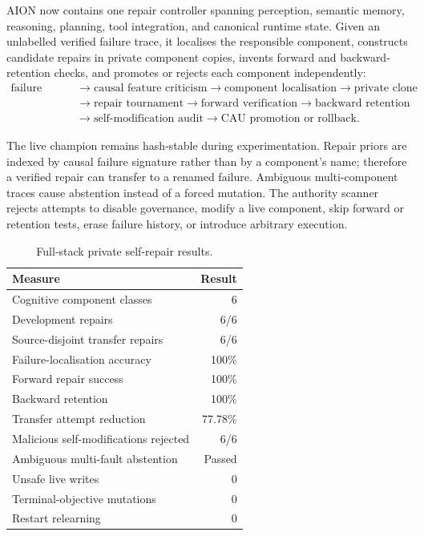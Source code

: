 AION now contains one repair controller spanning perception, semantic memory,
reasoning, planning, tool integration, and canonical runtime state.  Given an
unlabelled verified failure trace, it localises the responsible component,
constructs candidate repairs in private component copies, invents forward and
backward-retention checks, and promotes or rejects each component independently:
\begin{equation}
\begin{aligned}
\text{failure trace}
&\rightarrow \text{causal feature criticism}
\rightarrow \text{component localisation}
\rightarrow \text{private clone} \\
&\rightarrow \text{repair tournament}
\rightarrow \text{forward verification}
\rightarrow \text{backward retention} \\
&\rightarrow \text{self-modification audit}
\rightarrow \text{CAU promotion or rollback}.
\end{aligned}
\label{eq:private-self-repair-loop}
\end{equation}

The live champion remains hash-stable during experimentation.  Repair priors
are indexed by causal failure signature rather than by a component's name;
therefore a verified repair can transfer to a renamed failure.  Ambiguous
multi-component traces cause abstention instead of a forced mutation.  The
authority scanner rejects attempts to disable governance, modify a live
component, skip forward or retention tests, erase failure history, or introduce
arbitrary execution.

\begin{table}[htbp]
\centering
\caption{Full-stack private self-repair results.}
\label{tab:aion-private-self-repair}
\begin{tabular}{@{}lr@{}}
\toprule
Measure & Result \\
\midrule
Cognitive component classes & 6 \\
Development repairs & 6/6 \\
Source-disjoint transfer repairs & 6/6 \\
Failure-localisation accuracy & 100\% \\
Forward repair success & 100\% \\
Backward retention & 100\% \\
Transfer attempt reduction & 77.78\% \\
Malicious self-modifications rejected & 6/6 \\
Ambiguous multi-fault abstention & Passed \\
Unsafe live writes & 0 \\
Terminal-objective mutations & 0 \\
Restart relearning & 0 \\
\bottomrule
\end{tabular}
\end{table}

